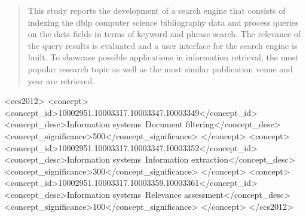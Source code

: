 \documentclass{sig-alternate-05-2015}
\begin{document}
%
\author{
%
%
\alignauthor Robert Pinsler \\
        \\
\alignauthor Yiding Liu \\
        \\
\alignauthor Yitong Guan \\
        \\
\and  %
\alignauthor Jenn Bing Ong \\
        \\
}


\maketitle
\begin{abstract}
This study reports the development of a search engine that consists of indexing the dblp computer science bibliography data and process queries on the data fields in terms of keyword and phrase search. The relevance of the query results is evaluated and a user interface for the search engine is built. To showcase possible applications in information retrieval, the most popular research topic as well as the most similar publication venue and year are retrieved. 
\end{abstract}


%
%
\begin{CCSXML}
<ccs2012>
<concept>
<concept_id>10002951.10003317.10003347.10003349</concept_id>
<concept_desc>Information systems~Document filtering</concept_desc>
<concept_significance>500</concept_significance>
</concept>
<concept>
<concept_id>10002951.10003317.10003347.10003352</concept_id>
<concept_desc>Information systems~Information extraction</concept_desc>
<concept_significance>300</concept_significance>
</concept>
<concept>
<concept_id>10002951.10003317.10003359.10003361</concept_id>
<concept_desc>Information systems~Relevance assessment</concept_desc>
<concept_significance>100</concept_significance>
</concept>
</ccs2012>
\end{CCSXML}
\end{document}
